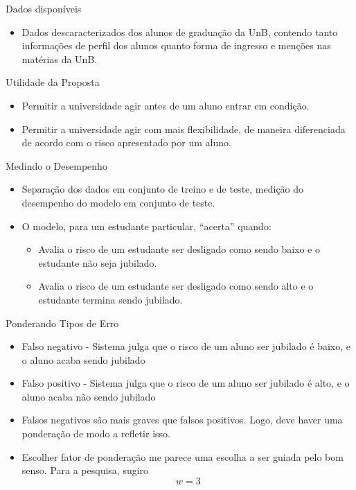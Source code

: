 \begin{frame}{Dados disponíveis}
    \begin{itemize}[itemsep=3ex]
        \item Dados descaracterizados dos alunos de graduação da UnB, contendo tanto 
            informações de perfil dos alunos quanto forma de ingresso e menções nas
            matérias da UnB. 
    \end{itemize}
\end{frame}


\begin{frame}{Utilidade da Proposta}
    \begin{itemize}[itemsep=3ex]
        \item Permitir a universidade agir antes de um aluno entrar em condição. 
        \item Permitir a universidade agir com mais flexibilidade, 
            de maneira diferenciada de acordo com o risco apresentado por um aluno. 
    \end{itemize}
\end{frame}

\begin{frame}{Medindo o Desempenho}
    \begin{itemize}[itemsep=3ex]
        \item Separação dos dados em conjunto de treino e de teste, medição do
            desempenho do modelo em conjunto de teste.
        \item O modelo, para um estudante particular, ``acerta'' quando:
        \begin{itemize}[itemsep=1.5ex]
        \item Avalia o risco de um estudante ser desligado como sendo baixo 
            e o estudante não seja jubilado.
        \item Avalia o risco de um estudante ser desligado como sendo
            alto e o estudante termina sendo jubilado.
        \end{itemize}
    \end{itemize}
\end{frame}

\begin{frame}{Ponderando Tipos de Erro}
    \begin{itemize}[itemsep=3ex]
        \item Falso negativo - Sistema julga que o risco de um aluno ser jubilado é baixo, e
            o aluno acaba sendo jubilado
        \item Falso positivo - Sistema julga que o risco de um aluno ser jubilado é alto, e
            o aluno acaba não sendo jubilado
        \item Falsos negativos são mais graves que falsos positivos. 
            Logo, deve haver uma ponderação de modo a refletir isso.
        \item Escolher fator de ponderação me parece uma escolha a ser guiada pelo
            bom senso. Para a pesquisa, sugiro $$w = 3$$
    \end{itemize}
\end{frame}
